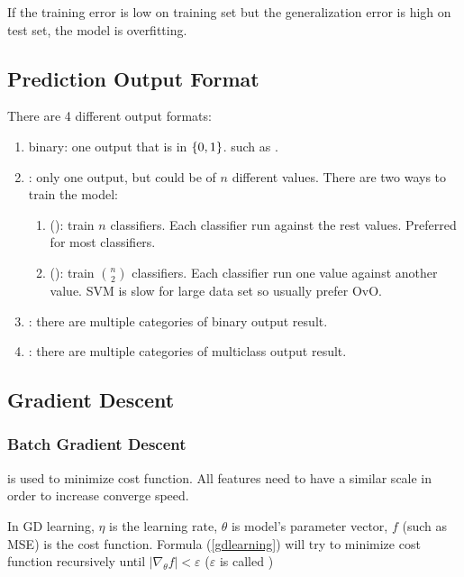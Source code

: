 If the training error is low on training set but the generalization error is high on test set, the model is overfitting. 








\subsection{Prediction Output Format}


There are 4 different output formats:
\begin{enumerate}
    \item binary: one output that is in $\set{ 0, 1}$. such as .
    \item {}: only one output, but could be of $n$ different values. There are two ways to train the model:
        \begin{enumerate}
            \item {} (): train $n$ classifiers. Each classifier run against the rest values. Preferred for most classifiers.
            \item {} (): train $\binom{n}{2}$ classifiers. Each classifier run one value against another value. SVM is slow for large data set so usually prefer OvO.
        \end{enumerate}
    \item {}: there are multiple categories of binary output result.
    \item {}: there are multiple categories of multiclass output result.
\end{enumerate}





\subsection{Gradient Descent}

\subsubsection{Batch Gradient Descent}

 is used to minimize cost function. All features need to have a similar scale in order to increase converge speed.

In GD learning, $\eta$ is the learning rate, $\theta$ is model's parameter vector, $f$ (such as MSE) is the cost function. Formula (\ref{gdlearning}) will try to minimize cost function recursively until $|\nabla_\theta f| < \varepsilon$ ($\varepsilon$ is called )

